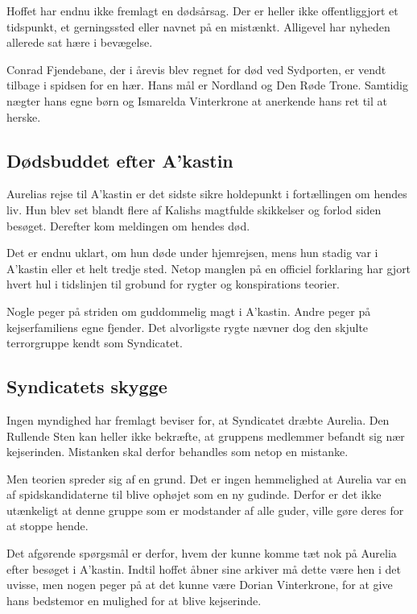 \documentclass[a5paper,10pt,twoside,openany]{memoir}
\begin{document}
Hoffet har endnu ikke fremlagt en dødsårsag. Der er heller ikke offentliggjort et tidspunkt, et gerningssted eller navnet på en mistænkt. Alligevel har nyheden allerede sat hære i bevægelse.

Conrad Fjendebane, der i årevis blev regnet for død ved Sydporten, er vendt tilbage i spidsen for en hær. Hans mål er Nordland og Den Røde Trone. Samtidig nægter hans egne børn og Ismarelda Vinterkrone at anerkende hans ret til at herske.

\subsection*{Dødsbuddet efter A'kastin}

Aurelias rejse til A'kastin er det sidste sikre holdepunkt i fortællingen om hendes liv. Hun blev set blandt flere af Kalishs magtfulde skikkelser og forlod siden besøget. Derefter kom meldingen om hendes død.

Det er endnu uklart, om hun døde under hjemrejsen, mens hun stadig var i A'kastin eller et helt tredje sted. Netop manglen på en officiel forklaring har gjort hvert hul i tidslinjen til grobund for rygter og konspirations teorier.

Nogle peger på striden om guddommelig magt i A'kastin. Andre peger på kejserfamiliens egne fjender. Det alvorligste rygte nævner dog den skjulte terrorgruppe kendt som Syndicatet.

\subsection*{Syndicatets skygge}

Ingen myndighed har fremlagt beviser for, at Syndicatet dræbte Aurelia. Den Rullende Sten kan heller ikke bekræfte, at gruppens medlemmer befandt sig nær kejserinden. Mistanken skal derfor behandles som netop en mistanke.

Men teorien spreder sig af en grund. Det er ingen hemmelighed at Aurelia var en af spidskandidaterne til blive ophøjet som en ny gudinde. Derfor er det ikke utænkeligt at denne gruppe som er modstander af alle guder, ville gøre deres for at stoppe hende.

Det afgørende spørgsmål er derfor, hvem der kunne komme tæt nok på Aurelia efter besøget i A'kastin. Indtil hoffet åbner sine arkiver må dette være hen i det uvisse, men nogen peger på at det kunne være Dorian Vinterkrone, for at give hans bedstemor en mulighed for at blive kejserinde.
\end{document}

